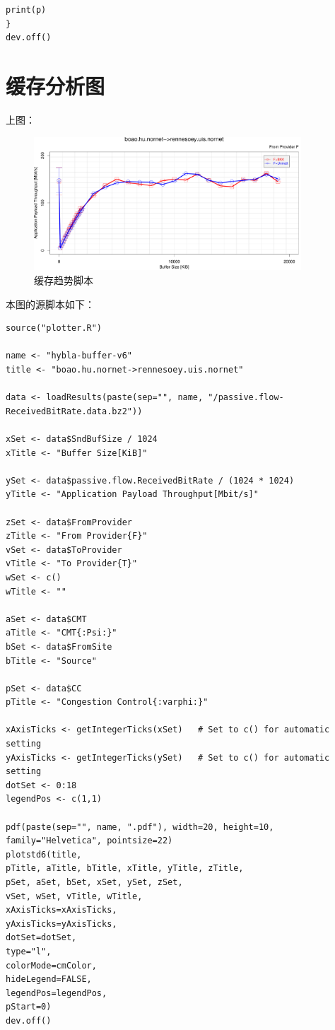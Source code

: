 \documentclass[a4paper,12pt]{ctexbook}
\begin{document}
\begin{flushleft}
\begin{verbatim}
print(p)
}
dev.off()
\end{verbatim}

\newpage
\section{缓存分析图}
上图：
\begin{figure}[H]
	\begin{center}
		\includegraphics[width=10cm]{NorNet示例/hybla-buffer-uib-ku缓冲模型/hybla-buffer.pdf}
		\caption{缓存趋势脚本}
	\end{center}
\end{figure}
本图的源脚本如下：
\begin{verbatim}
source("plotter.R")

name <- "hybla-buffer-v6"
title <- "boao.hu.nornet->rennesoey.uis.nornet"

data <- loadResults(paste(sep="", name, "/passive.flow-ReceivedBitRate.data.bz2"))

xSet <- data$SndBufSize / 1024
xTitle <- "Buffer Size[KiB]"

ySet <- data$passive.flow.ReceivedBitRate / (1024 * 1024)
yTitle <- "Application Payload Throughput[Mbit/s]"

zSet <- data$FromProvider
zTitle <- "From Provider{F}"
vSet <- data$ToProvider
vTitle <- "To Provider{T}"
wSet <- c()
wTitle <- ""

aSet <- data$CMT
aTitle <- "CMT{:Psi:}"
bSet <- data$FromSite
bTitle <- "Source"

pSet <- data$CC
pTitle <- "Congestion Control{:varphi:}"

xAxisTicks <- getIntegerTicks(xSet)   # Set to c() for automatic setting
yAxisTicks <- getIntegerTicks(ySet)   # Set to c() for automatic setting
dotSet <- 0:18
legendPos <- c(1,1)

pdf(paste(sep="", name, ".pdf"), width=20, height=10, family="Helvetica", pointsize=22)
plotstd6(title,
pTitle, aTitle, bTitle, xTitle, yTitle, zTitle,
pSet, aSet, bSet, xSet, ySet, zSet,
vSet, wSet, vTitle, wTitle,
xAxisTicks=xAxisTicks,
yAxisTicks=yAxisTicks,
dotSet=dotSet,
type="l",
colorMode=cmColor,
hideLegend=FALSE,
legendPos=legendPos,
pStart=0)
dev.off()
\end{verbatim}


\end{flushleft}
\end{document}
